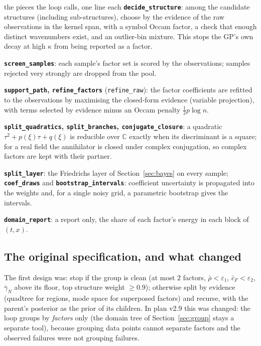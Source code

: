 \documentclass[11pt,a4paper]{article}
\theoremstyle{definition}
\begin{document}
\begin{explained}{the pieces the loop calls, one line each}
\textbf{\texttt{decide\_structure}}: among the candidate structures (including sub-structures), choose by the evidence of the raw observations in the kernel span, with a symbol Occam factor, a check that enough distinct wavenumbers exist, and an outlier-bin mixture. This stops the GP's own decay at high $\kappa$ from being reported as a factor.

\medskip\textbf{\texttt{screen\_samples}}: each sample's factor set is scored by the observations; samples rejected very strongly are dropped from the pool.

\medskip\textbf{\texttt{support\_path}, \texttt{refine\_factors}} (\texttt{refine\_raw}): the factor coefficients are refitted to the observations by maximising the closed-form evidence (variable projection), with terms selected by evidence minus an Occam penalty $\tfrac12p\log n$.

\medskip\textbf{\texttt{split\_quadratics}, \texttt{split\_branches}, \texttt{conjugate\_closure}}: a quadratic $\tau^2+p(\xi)\tau+q(\xi)$ is reducible over $\mathbb C$ exactly when its discriminant is a square; for a real field the annihilator is closed under complex conjugation, so complex factors are kept with their partner.

\medskip\textbf{\texttt{split\_layer}}: the Friedrichs layer of Section~\ref{sec:bayes} on every sample; \textbf{\texttt{coef\_draws}} and \textbf{\texttt{bootstrap\_intervals}}: coefficient uncertainty is propagated into the weights and, for a single noisy grid, a parametric bootstrap gives the intervals.

\medskip\textbf{\texttt{domain\_report}}: a report only, the share of each factor's energy in each block of $(t,x)$.
\end{explained}

\subsection{The original specification, and what changed}
The first design was: stop if the group is clean (at most $2$ factors, $\bar\rho<\varepsilon_1$, $\bar c_F<\varepsilon_2$, $\bar\gamma_N$ above its floor, top structure weight $\ge0.9$); otherwise split by evidence (quadtree for regions, mode space for superposed factors) and recurse, with the parent's posterior as the prior of its children. In plan v2.9 this was changed: the loop groups by \emph{factors} only (the domain tree of Section~\ref{sec:group} stays a separate tool), because grouping data points cannot separate factors and the observed failures were not grouping failures.
\end{document}
